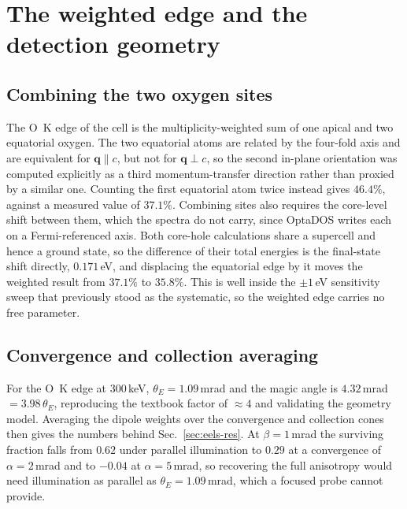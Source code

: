 \documentclass[aps,prb,twocolumn,superscriptaddress,floatfix,nofootinbib]{revtex4-2}
\begin{document}
\section{The weighted edge and the detection geometry}
\label{app:geom}
\setcounter{table}{0}
\setcounter{figure}{0}

\subsection{Combining the two oxygen sites}

The O~K edge of the cell is the multiplicity-weighted sum of one apical and two equatorial oxygen. The two equatorial atoms are related by the four-fold axis and are equivalent for $\mathbf{q}\parallel c$, but not for $\mathbf{q}\perp c$, so the second in-plane orientation was computed explicitly as a third momentum-transfer direction rather than proxied by a similar one. Counting the first equatorial atom twice instead gives $46.4\%$, against a measured value of $37.1\%$. Combining sites also requires the core-level shift between them, which the spectra do not carry, since OptaDOS writes each on a Fermi-referenced axis. Both core-hole calculations share a supercell and hence a ground state, so the difference of their total energies is the final-state shift directly, $0.171$\,eV, and displacing the equatorial edge by it moves the weighted result from $37.1\%$ to $35.8\%$. This is well inside the $\pm1$\,eV sensitivity sweep that previously stood as the systematic, so the weighted edge carries no free parameter.

\subsection{Convergence and collection averaging}

For the O~K edge at $300$\,keV, $\theta_E=1.09$\,mrad and the magic angle is $4.32$\,mrad $=3.98\,\theta_E$, reproducing the textbook factor of $\approx4$ and validating the geometry model. Averaging the dipole weights over the convergence and collection cones then gives the numbers behind Sec.~\ref{sec:eels-res}. At $\beta=1$\,mrad the surviving fraction falls from $0.62$ under parallel illumination to $0.29$ at a convergence of $\alpha=2$\,mrad and to $-0.04$ at $\alpha=5$\,mrad, so recovering the full anisotropy would need illumination as parallel as $\theta_E=1.09$\,mrad, which a focused probe cannot provide.
\end{document}
